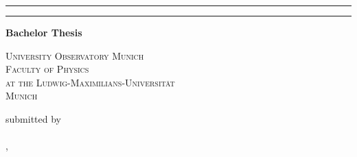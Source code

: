 \begin{titlepage}   

    {\parindent0cm
    \rule{\linewidth}{.4ex}}  
  \begin{center}
    {\sffamily \bfseries \Huge \getTitleEN \par}
  \end{center}
    \rule{\linewidth}{.4ex}
  

  \begin{center}
    {\rmfamily \bfseries \Large Bachelor Thesis}


    {\scshape \large
     University Observatory Munich \\
     Faculty of Physics \\
     at the Ludwig-Maximilians-Universität \\
     Munich


     submitted by \\

     {\rmfamily \bfseries \Large \getAuthor} \\


     \getPrintLocationEN, \getSubmissionDateEN
     }
  \end{center}
  
\end{titlepage}
